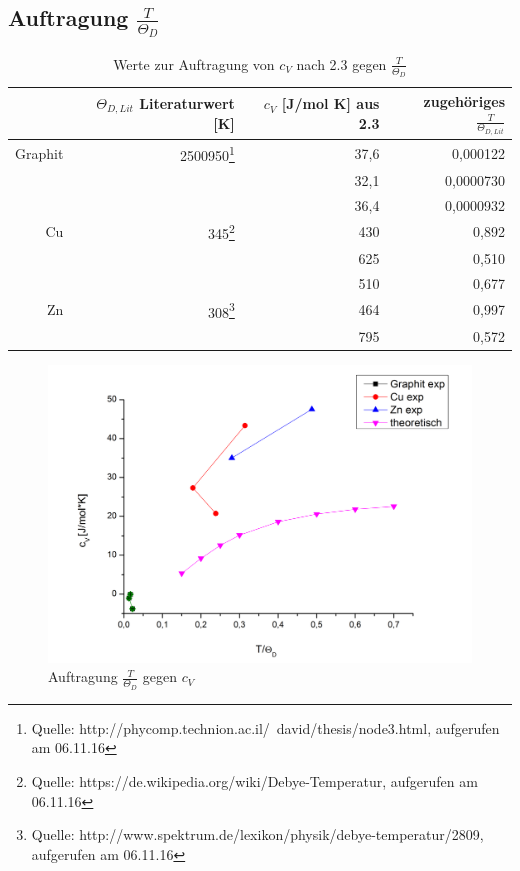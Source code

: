 \documentclass[12pt,a4paper,titlepage,headinclude,bibtotoc]{scrartcl}
\begin{document}
\subsection{Auftragung $\frac{T}{\Theta_D}$}

\begin{table} [h]
\centering
\caption{Werte zur Auftragung von $c_V$ nach 2.3 gegen $\frac{T}{\Theta_D}$}
\begin{tabular} {r | r |r | r }
&$\Theta_{D,Lit}$ Literaturwert [K] &$c_V$ [J/mol K] aus 2.3& zugehöriges $\frac{T}{\Theta_{D,Lit}}$ \\
\hline
Graphit& 2500950\protect\footnote{Quelle: http://phycomp.technion.ac.il/~david/thesis/node3.html, aufgerufen am 06.11.16} &37,6&0,000122 \\
&&32,1& 0,0000730 \\
&&36,4& 0,0000932 \\
Cu&345\protect\footnote{Quelle: https://de.wikipedia.org/wiki/Debye-Temperatur, aufgerufen am 06.11.16} &430& 0,892 \\
&&625& 0,510\\
&&510& 0,677\\
Zn&308\protect\footnote{Quelle: http://www.spektrum.de/lexikon/physik/debye-temperatur/2809, aufgerufen am 06.11.16} &464& 0,997\\
&&795& 0,572\\
\end{tabular}
\end{table}


\begin{figure} [h!]
\begin{center}
\includegraphics[scale=0.5]{Auswertung7.png} \end{center}
\caption{Auftragung $\frac{T}{\Theta_D}$ gegen $c_V$ }
\end{figure}
\end{document}
